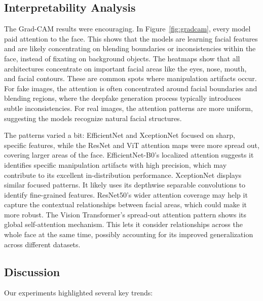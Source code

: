 \documentclass[conference]{IEEEtran}
\begin{document}
\subsection{Interpretability Analysis}
The Grad-CAM results were encouraging. In Figure~\ref{fig:gradcam}, every model paid attention to the face. This shows that the models are learning facial features and are likely concentrating on blending boundaries or inconsistencies within the face, instead of fixating on background objects. The heatmaps show that all architectures concentrate on important facial areas like the eyes, nose, mouth, and facial contours. These are common spots where manipulation artifacts occur. For fake images, the attention is often concentrated around facial boundaries and blending regions, where the deepfake generation process typically introduces subtle inconsistencies. For real images, the attention patterns are more uniform, suggesting the models recognize natural facial structures.

The patterns varied a bit: EfficientNet and XceptionNet focused on sharp, specific features, while the ResNet and ViT attention maps were more spread out, covering larger areas of the face. EfficientNet-B0's localized attention suggests it identifies specific manipulation artifacts with high precision, which may contribute to its excellent in-distribution performance. XceptionNet displays similar focused patterns. It likely uses its depthwise separable convolutions to identify fine-grained features. ResNet50's wider attention coverage may help it capture the contextual relationships between facial areas, which could make it more robust. The Vision Transformer's spread-out attention pattern shows its global self-attention mechanism. This lets it consider relationships across the whole face at the same time, possibly accounting for its improved generalization across different datasets.

\subsection{Discussion}
Our experiments highlighted several key trends:
\end{document}
